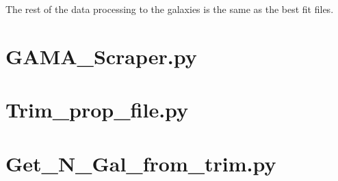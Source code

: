 \documentclass[11pt]{article}
\begin{document}
The rest of the data processing to the galaxies is the same as the best fit files.



\newpage



\section{GAMA\_Scraper.py}

\newpage


\section{Trim\_prop\_file.py}

\newpage



\section{Get\_N\_Gal\_from\_trim.py}


\newpage
\end{document}
